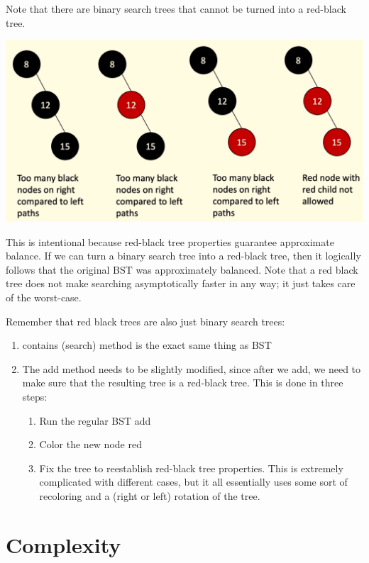\documentclass{article}
\begin{document}
    Note that there are binary search trees that cannot be turned into a red-black tree. 
    \begin{center}
        \includegraphics[scale=0.3]{img/impossible_red_black.png}
    \end{center}
    This is intentional because red-black tree properties guarantee approximate balance. If we can turn a binary search tree into a red-black tree, then it logically follows that the original BST was approximately balanced. Note that a red black tree does not make searching asymptotically faster in any way; it just takes care of the worst-case. 

    Remember that red black trees are also just binary search trees: 
    \begin{enumerate}
        \item contains (search) method is the exact same thing as BST 
        \item The add method needs to be slightly modified, since after we add, we need to make sure that the resulting tree is a red-black tree. This is done in three steps: 
        \begin{enumerate}
            \item Run the regular BST add 
            \item Color the new node red 
            \item Fix the tree to reestablish red-black tree properties. This is extremely complicated with different cases, but it all essentially uses some sort of recoloring and a (right or left) rotation of the tree. 
        \end{enumerate}
    \end{enumerate}

\section{Complexity}
\end{document}
